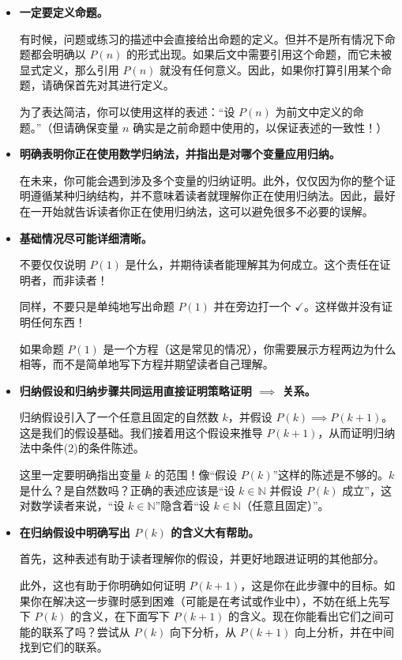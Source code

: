 \begin{itemize}
    \item \textbf{一定要定义命题。}
    
    有时候，问题或练习的描述中会直接给出命题的定义。但并不是所有情况下命题都会明确以 $P(n)$ 的形式出现。如果后文中需要引用这个命题，而它未被显式定义，那么引用 $P(n)$ 就没有任何意义。因此，如果你打算引用某个命题，请确保首先对其进行定义。

    为了表达简洁，你可以使用这样的表述：``设 $P(n)$ 为前文中定义的命题。''（但请确保变量 $n$ 确实是之前命题中使用的，以保证表述的一致性！）

    \item \textbf{明确表明你正在使用数学归纳法，并指出是对哪个变量应用归纳。}
    
    在未来，你可能会遇到涉及多个变量的归纳证明。此外，仅仅因为你的整个证明遵循某种归纳结构，并不意味着读者就理解你正在使用归纳法。因此，最好在一开始就告诉读者你正在使用归纳法，这可以避免很多不必要的误解。

    \item \textbf{基础情况尽可能详细清晰。}
    
    不要仅仅说明 $P(1)$ 是什么，并期待读者能理解其为何成立。这个责任在证明者，而非读者！

    同样，不要只是单纯地写出命题 $P(1)$ 并在旁边打一个 $\checkmark$。这样做并没有证明任何东西！

    如果命题 $P(1)$ 是一个方程（这是常见的情况），你需要展示方程两边为什么相等，而不是简单地写下方程并期望读者自己理解。

    \item \textbf{归纳假设和归纳步骤共同运用直接证明策略证明 $\implies$ 关系。}
    
    归纳假设引入了一个任意且固定的自然数 $k$，并假设 $P(k) \implies P(k+1)$。这是我们的假设基础。我们接着用这个假设来推导 $P(k+1)$，从而证明归纳法中条件(2)的条件陈述。

    这里一定要明确指出变量 $k$ 的范围！像``假设 $P(k)$''这样的陈述是不够的。$k$ 是什么？是自然数吗？正确的表述应该是``设 $k \in \mathbb{N}$ 并假设 $P(k)$ 成立''，这对数学读者来说，``设 $k \in \mathbb{N}$''隐含着``设 $k \in \mathbb{N}$（任意且固定）''。

    \item \textbf{在归纳假设中明确写出 $P(k)$ 的含义大有帮助。}
    
    首先，这种表述有助于读者理解你的假设，并更好地跟进证明的其他部分。

    此外，这也有助于你明确如何证明 $P(k+1)$，这是你在此步骤中的目标。如果你在解决这一步骤时感到困难（可能是在考试或作业中），不妨在纸上先写下 $P(k)$ 的含义，在下面写下 $P(k+1)$ 的含义。现在你能看出它们之间可能的联系了吗？尝试从 $P(k)$ 向下分析，从 $P(k+1)$ 向上分析，并在中间找到它们的联系。


\end{itemize}

